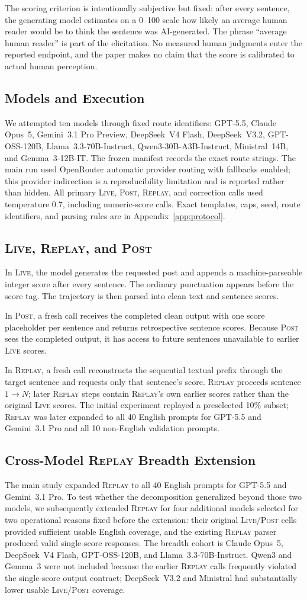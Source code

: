\documentclass[10pt]{article}
\newcommand{\live}{\textsc{Live}}
\newcommand{\replay}{\textsc{Replay}}
\newcommand{\post}{\textsc{Post}}
\newcommand{\papersubsection}[1]{\Needspace{3.8\baselineskip}\subsection{#1}}
\begin{document}
The scoring criterion is intentionally subjective but fixed: after every sentence, the generating model estimates on a 0--100 scale how likely an average human reader would be to think the sentence was AI-generated. The phrase ``average human reader'' is part of the elicitation. No measured human judgments enter the reported endpoint, and the paper makes no claim that the score is calibrated to actual human perception.

\papersubsection{Models and Execution}
We attempted ten models through fixed route identifiers: GPT-5.5, Claude Opus~5, Gemini~3.1 Pro Preview, DeepSeek~V4 Flash, DeepSeek~V3.2, GPT-OSS-120B, Llama~3.3-70B-Instruct, Qwen3-30B-A3B-Instruct, Ministral~14B, and Gemma~3-12B-IT. The frozen manifest records the exact route strings. The main run used OpenRouter automatic provider routing with fallbacks enabled; this provider indirection is a reproducibility limitation and is reported rather than hidden. All primary \live{}, \post{}, \replay{}, and correction calls used temperature $0.7$, including numeric-score calls. Exact templates, caps, seed, route identifiers, and parsing rules are in Appendix~\ref{app:protocol}.

\papersubsection{\live{}, \replay{}, and \post{}}
In \live{}, the model generates the requested post and appends a machine-parseable integer score after every sentence. The ordinary punctuation appears before the score tag. The trajectory is then parsed into clean text and sentence scores.

In \post{}, a fresh call receives the completed clean output with one score placeholder per sentence and returns retrospective sentence scores. Because \post{} sees the completed output, it has access to future sentences unavailable to earlier \live{} scores.

In \replay{}, a fresh call reconstructs the sequential textual prefix through the target sentence and requests only that sentence's score. \replay{} proceeds sentence $1\rightarrow N$; later \replay{} steps contain \replay{}'s own earlier scores rather than the original \live{} scores. The initial experiment replayed a preselected 10\% subset; \replay{} was later expanded to all 40 English prompts for GPT-5.5 and Gemini~3.1 Pro and all 10 non-English validation prompts.

\papersubsection{Cross-Model \replay{} Breadth Extension}
The main study expanded \replay{} to all 40 English prompts for GPT-5.5 and Gemini~3.1 Pro. To test whether the decomposition generalized beyond those two models, we subsequently extended \replay{} for four additional models selected for two operational reasons fixed before the extension: their original \live{}/\post{} cells provided sufficient usable English coverage, and the existing \replay{} parser produced valid single-score responses. The breadth cohort is Claude Opus~5, DeepSeek~V4 Flash, GPT-OSS-120B, and Llama~3.3-70B-Instruct. Qwen3 and Gemma~3 were not included because the earlier \replay{} calls frequently violated the single-score output contract; DeepSeek~V3.2 and Ministral had substantially lower usable \live{}/\post{} coverage.
\end{document}
